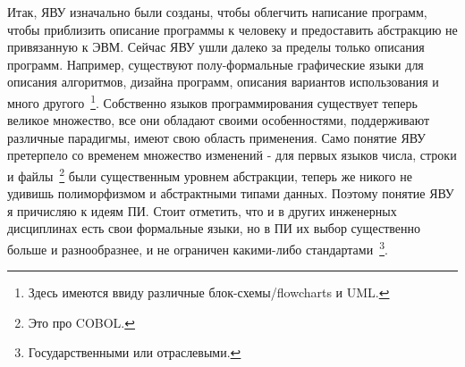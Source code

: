 Итак, ЯВУ изначально были созданы, чтобы облегчить написание программ, чтобы приблизить описание программы к человеку и предоставить абстракцию не привязанную к ЭВМ. Сейчас ЯВУ ушли далеко за пределы только описания программ. Например, существуют полу-формальные графические языки для описания алгоритмов, дизайна программ, описания вариантов использования и много другого~\footnote{Здесь имеются ввиду различные блок-схемы/flowcharts и UML.}. Собственно языков программирования существует теперь великое множество, все они обладают своими особенностями, поддерживают различные парадигмы, имеют свою область применения. Само понятие ЯВУ претерпело со временем множество изменений - для первых языков числа, строки и файлы~\footnote{Это про COBOL.} были существенным уровнем абстракции, теперь же никого не удивишь полиморфизмом и абстрактными типами данных. Поэтому понятие ЯВУ я причисляю к идеям ПИ. Стоит отметить, что и в других инженерных дисциплинах есть свои формальные языки, но в ПИ их выбор существенно больше и разнообразнее, и не ограничен какими-либо стандартами~\footnote{Государственными или отраслевыми.}.
